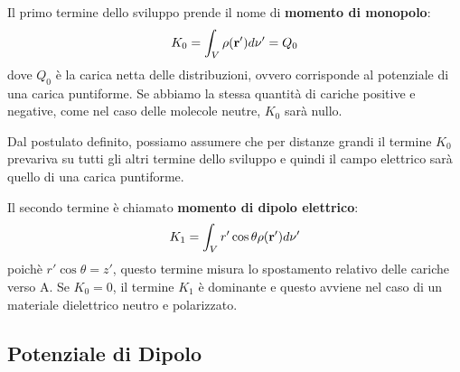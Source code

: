 \begin{center}
\end{center}

Il primo termine dello sviluppo prende il nome di \textbf{momento di monopolo}:
\begin{equation}
	K_0 = \int_{V} \rho(\bold{r}') d \nu' = Q_0
\end{equation}
dove $Q_0$ \`e la carica netta delle distribuzioni, ovvero corrisponde al potenziale di una carica puntiforme. Se abbiamo la stessa quantit\`a di cariche positive e negative, come nel caso delle molecole neutre, $K_0$ sar\`a nullo. 

\begin{remark}
Dal postulato definito, possiamo assumere che per distanze grandi il termine $K_0$ prevariva su tutti gli altri termine dello sviluppo e quindi il campo elettrico sar\`a quello di una carica puntiforme.	
\end{remark}

Il secondo termine \`e chiamato \textbf{momento di dipolo elettrico}:
\begin{equation}
	K_1 = \int_{V} r' \cos\theta \rho (\bold{r}') d \nu'	
\end{equation}
poich\`e $r' \cos \theta = z'$, questo termine misura lo spostamento relativo delle cariche verso A. Se $K_0 = 0$, il termine $K_1$ \`e dominante e questo avviene nel caso di un materiale dielettrico neutro e polarizzato.

\subsection{Potenziale di Dipolo}


